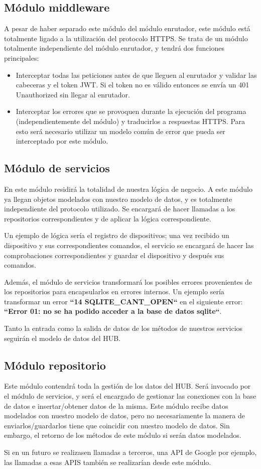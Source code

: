 \subsection{Módulo middleware}
A pesar de haber separado este módulo del módulo enrutador, este módulo está totalmente ligado a la utilización del protocolo HTTPS. 
Se trata de un módulo totalmente independiente del módulo enrutador, y tendrá dos funciones principales:
\begin{itemize}
\item Interceptar todas las peticiones antes de que lleguen al enrutador y validar las cabeceras y el token JWT. Si el token no es válido entonces
se envía un 401 Unauthorized sin llegar al enrutador.
\item Interceptar los errores que se provoquen durante la ejecución del programa (independientemente del módulo) y traducirlos a respuestas HTTPS. Para esto 
será necesario utilizar un modelo común de error que pueda ser interceptado por este módulo.
\end{itemize}
\subsection{Módulo de servicios}
En este módulo residirá la totalidad de nuestra lógica de negocio. A este módulo ya llegan objetos modelados con nuestro modelo de datos, y es totalmente
independiente del protocolo utilizado. Se encargará de hacer llamadas a los repositorios correspondientes y de aplicar la lógica correspondiente.
\par
Un ejemplo de lógica sería el registro de dispositivos; una vez recibido un dispositivo y sus correspondientes comandos, el servicio se encargará de hacer
las comprobaciones correspondientes y guardar el dispositivo y después sus comandos.
\par
Además, el módulo de servicios transformará los posibles errores provenientes de los repositorios para encapsularlos en errores internos. Un ejemplo sería
transformar un error \textbf{``14 SQLITE\_CANT\_OPEN``} en el siguiente error: \textbf{``Error 01: no se ha podido acceder a la base de datos sqlite``}.
\par
Tanto la entrada como la salida de datos de los métodos de nuestros servicios seguirán el modelo de datos del HUB.
\subsection{Módulo repositorio}
Este módulo contendrá toda la gestión de los datos del HUB. Será invocado por el módulo de servicios, y 
será el encargado de gestionar las conexiones con la base de datos e insertar/obtener datos de la misma.
Este módulo recibe datos modelados con nuestro modelo de datos, pero no necesariamente la manera de enviarlos/guardarlos tiene que coincidir con nuestro modelo 
de datos. Sin embargo, el retorno de los métodos de este módulo si serán datos modelados.
\par
Si en un futuro se realizasen llamadas a terceros, una API de Google por ejemplo, las llamadas a esas APIS también se realizarían desde este módulo.
